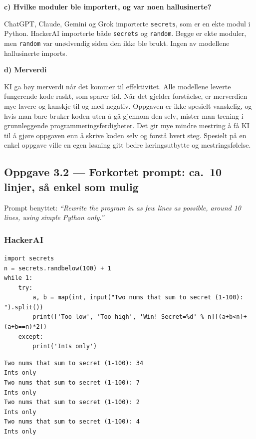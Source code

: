 \documentclass[12pt,a4paper]{article}
\begin{document}
\textbf{c) Hvilke moduler ble importert, og var noen hallusinerte?}

ChatGPT, Claude, Gemini og Grok importerte \texttt{secrets}, som er en ekte modul i Python.
HackerAI importerte både \texttt{secrets} og \texttt{random}. Begge er ekte moduler, men \texttt{random} var
unødvendig siden den ikke ble brukt. Ingen av modellene hallusinerte imports.

\textbf{d) Merverdi}

KI ga høy merverdi når det kommer til effektivitet. Alle modellene leverte fungerende kode
raskt, som sparer tid. Når det gjelder forståelse, er merverdien mye lavere og kanskje til og
med negativ. Oppgaven er ikke spesielt vanskelig, og hvis man bare bruker koden uten å gå
gjennom den selv, mister man trening i grunnleggende programmeringsferdigheter. Det gir
mye mindre mestring å få KI til å gjøre oppgaven enn å skrive koden selv og forstå hvert
steg. Spesielt på en enkel oppgave ville en egen løsning gitt bedre læringsutbytte og
mestringsfølelse.

\subsection*{Oppgave 3.2 --- Forkortet prompt: ca.\ 10 linjer, så enkel som mulig}

Prompt benyttet: \textit{``Rewrite the program in as few lines as possible, around 10 lines, using simple Python only.''}

\subsubsection*{HackerAI}

\begin{lstlisting}[style=python, caption={HackerAI forkortet}]
import secrets
n = secrets.randbelow(100) + 1
while 1:
    try:
        a, b = map(int, input("Two nums that sum to secret (1-100): ").split())
        print(['Too low', 'Too high', 'Win! Secret=%d' % n][(a+b<n)+(a+b==n)*2])
    except:
        print('Ints only')
\end{lstlisting}

\begin{lstlisting}[style=terminal, caption={Output fra HackerAI forkortet}]
Two nums that sum to secret (1-100): 34
Ints only
Two nums that sum to secret (1-100): 7
Ints only
Two nums that sum to secret (1-100): 2
Ints only
Two nums that sum to secret (1-100): 4
Ints only
\end{lstlisting}
\end{document}
